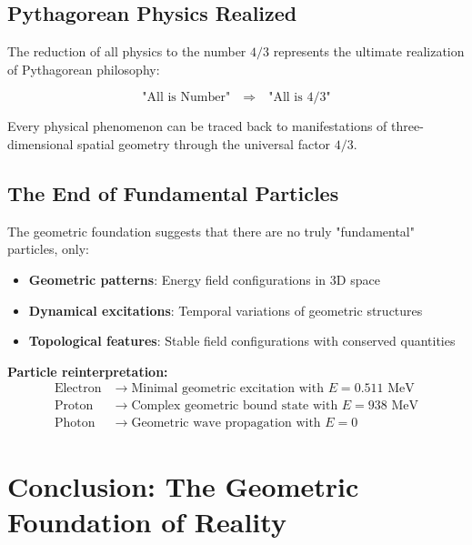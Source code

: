 \documentclass[12pt,a4paper]{report}
\begin{document}
	\subsection{Pythagorean Physics Realized}
	\label{subsec:pythagorean_physics}
	
	The reduction of all physics to the number $4/3$ represents the ultimate realization of Pythagorean philosophy:
	
	\begin{equation}
		\text{"All is Number"} \quad \Rightarrow \quad \text{"All is 4/3"}
	\end{equation}
	
	Every physical phenomenon can be traced back to manifestations of three-dimensional spatial geometry through the universal factor $4/3$.
	
	\subsection{The End of Fundamental Particles}
	\label{subsec:end_fundamental_particles}
	
	The geometric foundation suggests that there are no truly "fundamental" particles, only:
	
	\begin{itemize}
		\item \textbf{Geometric patterns}: Energy field configurations in 3D space
		\item \textbf{Dynamical excitations}: Temporal variations of geometric structures
		\item \textbf{Topological features}: Stable field configurations with conserved quantities
	\end{itemize}
	
	\textbf{Particle reinterpretation:}
	\begin{align}
		\text{Electron} &\rightarrow \text{Minimal geometric excitation with } E = 0.511 \text{ MeV} \\
		\text{Proton} &\rightarrow \text{Complex geometric bound state with } E = 938 \text{ MeV} \\
		\text{Photon} &\rightarrow \text{Geometric wave propagation with } E = 0
	\end{align}
	

	\section{Conclusion: The Geometric Foundation of Reality}
	\label{sec:conclusion_geometric}
	
\end{document}
